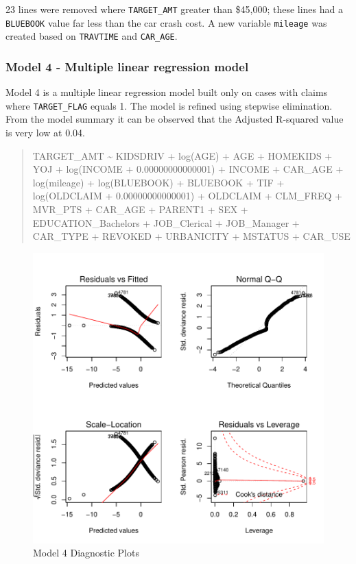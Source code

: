\documentclass[]{article}
\begin{document}
23 lines were removed where \texttt{TARGET\_AMT} greater than \$45,000;
these lines had a \texttt{BLUEBOOK} value far less than the car crash
cost. A new variable \texttt{mileage} was created based on
\texttt{TRAVTIME} and \texttt{CAR\_AGE}.

\subsubsection{Model 4 - Multiple linear regression
model}\label{model-4---multiple-linear-regression-model}

Model 4 is a multiple linear regression model built only on cases with
claims where \texttt{TARGET\_FLAG} equals 1. The model is refined using
stepwise elimination. From the model summary it can be observed that the
Adjusted R-squared value is very low at 0.04.

\begin{quote}
TARGET\_AMT \textasciitilde{} KIDSDRIV + log(AGE) + AGE + HOMEKIDS + YOJ
+ log(INCOME + 0.00000000000001) + INCOME + CAR\_AGE + log(mileage) +
log(BLUEBOOK) + BLUEBOOK + TIF + log(OLDCLAIM + 0.00000000000001) +
OLDCLAIM + CLM\_FREQ + MVR\_PTS + CAR\_AGE + PARENT1 + SEX +
EDUCATION\_Bachelors + JOB\_Clerical + JOB\_Manager + CAR\_TYPE +
REVOKED + URBANICITY + MSTATUS + CAR\_USE
\end{quote}

\begin{figure}
\centering
\includegraphics{proj4_files/figure-latex/f14-1.pdf}
\caption{\label{fig:f14}Model 4 Diagnostic Plots}
\end{figure}
\end{document}
